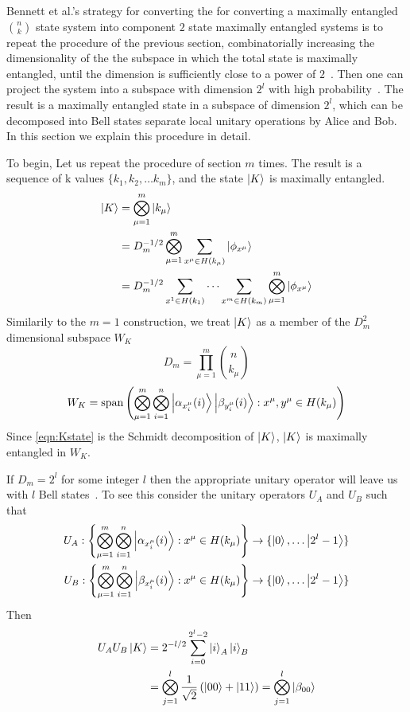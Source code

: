 Bennett et al.'s strategy for converting the for converting a maximally entangled $\binom{n}{k}$ state system into component $2$ state maximally entangled systems is to repeat the procedure of the previous section, combinatorially increasing the dimensionality of the the subspace in which the total state is maximally entangled, until the dimension is sufficiently close to a power of $2$~\cite{bennett1996concentrating}.
Then one can project the system into a subspace with dimension $2^l$ with high probability~\cite{bennett1996concentrating}.
The result is a maximally entangled state in a subspace of dimension $2^l$, which can be decomposed into Bell states separate local unitary operations by Alice and Bob.
In this section we explain this procedure in detail.

To begin, Let us repeat the procedure of section $m$ times. The result is a sequence of k values $\{k_1, k_2,\ldots k_m \}$, and the state
$\ket{K}$ is maximally entangled.
\begin{align}
\ket{K} &= \bigotimes_{\mu=1}^m \ket{k_\mu} \\
&= D_m^{-1/2} \bigotimes_{\mu=1}^m \sum_{x^\mu \in H(k_\mu)} \ket{\phi_{x^\mu}} \\
\label{eqn:Kstate}
&=  D_m^{-1/2} \sum_{x^1 \in H(k_1)} \cdots \sum_{x^m \in H(k_m)} \bigotimes_{\mu=1}^m  \ket{\phi_{x^\mu}}
\end{align}
Similarily to the $m=1$ construction, we treat $\ket{K}$ as a member of the $D_m^2$ dimensional subspace $W_K$
\begin{equation}
D_m = \prod_{\mu=1}^{m} \binom{n}{k_\mu}
\end{equation}
\begin{equation}
\label{eqn:Wk}
W_K = \text{span}\left(\bigotimes_{\mu=1}^m\bigotimes_{i=1}^n 
\ket{\alpha_{x_i^\mu}(i)} \ket{\beta_{y_i^\mu}(i)}: x^\mu,y^\mu \in H(k_\mu)\right)
\end{equation}
Since \eqref{eqn:Kstate} is the Schmidt decomposition of $\ket{K}$, $\ket{K}$ is maximally entangled in $W_K$.

If $D_m = 2^l$ for some integer $l$ then the appropriate unitary operator will leave us with $l$ Bell states~\cite{bennett1996concentrating}. To see this consider the unitary operators $U_A$ and $U_B$ such that
\begin{align}
U_A : \left\{
\bigotimes_{\mu=1}^m\bigotimes_{i=1}^n 
\ket{\alpha_{x_i^\mu}(i)}: x^\mu \in H(k_\mu) 
\right\} &\rightarrow \{\ket{0}, \ldots \ket{2^l-1
}\} \\
U_B :\left\{
\bigotimes_{\mu=1}^m\bigotimes_{i=1}^n 
\ket{\beta_{x_i^\mu}(i)}: x^\mu \in H(k_\mu) 
\right\} &\rightarrow \{\ket{0}, \ldots \ket{2^l-1
}\}
\end{align}
Then
\begin{align}
U_A U_B \ket{K} &= 2^{-l/2}\sum_{i=0}^{2^l-2} \ket{i}_A\ket{i}_B\\
&= \bigotimes_{j=1}^l \frac{1}{\sqrt{2}} \left(  \ket{00} + \ket{11} \right) =
\bigotimes_{j=1}^l \ket{\beta_{00}}
\end{align}
